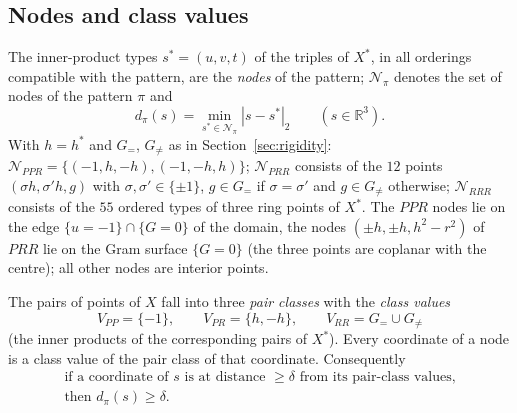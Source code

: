 \documentclass[11pt]{article}
\theoremstyle{definition}
\newcommand{\R}{\mathbb{R}}
\newcommand{\Xs}{X^{\ast}}
\newcommand{\hs}{h^{\ast}}
\begin{document}
\subsection{Nodes and class values}
The inner-product types $s^\ast=(u,v,t)$ of the triples of $\Xs$, in all orderings compatible with the pattern, are the
\emph{nodes} of the pattern; $\mathcal N_\pi$ denotes the set of nodes of the pattern $\pi$ and
\[
 d_\pi(s)=\min_{s^\ast\in\mathcal N_\pi}|s-s^\ast|_2\qquad(s\in\R^3).
\]
With $h=\hs$ and $G_=$, $G_{\ne}$ as in Section~\ref{sec:rigidity}: $\mathcal N_{PPR}=\{(-1,h,-h),(-1,-h,h)\}$;
$\mathcal N_{PRR}$ consists of the $12$ points $(\sigma h,\sigma'h,g)$ with $\sigma,\sigma'\in\{\pm1\}$, $g\in G_=$ if
$\sigma=\sigma'$ and $g\in G_{\ne}$ otherwise; $\mathcal N_{RRR}$ consists of the $55$ ordered types of three ring points of
$\Xs$. The $PPR$ nodes lie on the edge $\{u=-1\}\cap\{G=0\}$ of the domain, the nodes $(\pm h,\pm h,h^2-r^2)$ of $PRR$ lie
on the Gram surface $\{G=0\}$ (the three points are coplanar with the centre); all other nodes are interior points.

The pairs of points of $X$ fall into three \emph{pair classes} with the \emph{class values}
\[
 V_{PP}=\{-1\},\qquad V_{PR}=\{h,-h\},\qquad V_{RR}=G_=\cup G_{\ne}
\]
(the inner products of the corresponding pairs of $\Xs$). Every coordinate of a node is a class value of the pair class
of that coordinate. Consequently
\begin{equation}\label{eq:coord}
 \begin{gathered}
 \text{if a coordinate of $s$ is at distance $\ge\delta$ from its pair-class values,}\\
 \text{then }d_\pi(s)\ge\delta.
 \end{gathered}
\end{equation}
\end{document}
